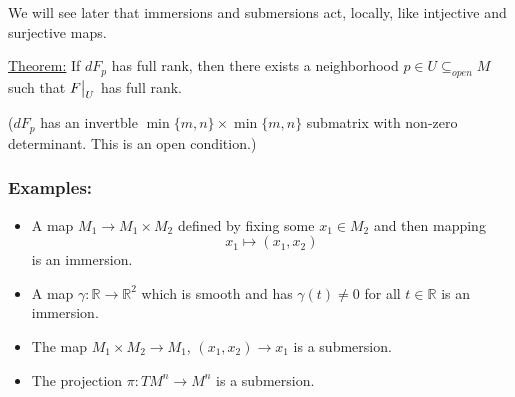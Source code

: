 \documentclass{article}
\newcommand{\R}{\mathbb{R}}
\newcommand{\restr}[2]{{%
  \left.\kern-\nulldelimiterspace %
  #1 %
  \vphantom{\big|} %
  \right|_{#2} %
  }}
\begin{document}
\vskip 0.5cm
We will see later that immersions and submersions act, locally, like intjective and surjective maps.

\vskip 0.5cm


\begin{dottedbox}
  \underline{Theorem:} If $dF_p$ has full rank, then there exists a neighborhood $p \in U \subseteq_{open} M$ such that $\restr{F}{U}$ has full rank.

  \vskip 0.25cm
  ($dF_p$ has an invertble $\min{\{m,n\}} \times \min{\{m,n\}}$ submatrix with non-zero determinant. This is an open condition.)
\end{dottedbox}

\vskip 0.5cm
\subsubsection*{Examples:}

\begin{itemize}
  \item A map $M_1 \rightarrow M_1 \times M_2$ defined by fixing some $x_1 \in M_2$ and then mapping 
  \[ x_1 \mapsto (x_1, x_2) \] is an immersion.

  \item A map $\gamma : \R \rightarrow \R^2$ which is smooth and has $\gamma(t) \neq 0$ for all $t \in \R$ is an immersion.
  
  \item The map $M_1 \times M_2 \rightarrow M_1$, $(x_1, x_2) \rightarrow x_1$ is a submersion.
  
  \item The projection $\pi : TM^n \rightarrow M^n$ is a submersion.
\end{itemize}
\end{document}

